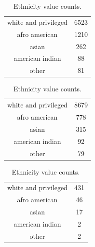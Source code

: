 \begin{table}[!h]
    \caption{Ethnicity value counts.}
    \label{tab:ethnicity}

    \begin{subtable}[ht]{.5\textwidth}
        \centering
        \begin{tabular}{cc}
            white and privileged & 6523 \\
            afro american & 1210 \\
            asian & 262 \\
            american indian & 88 \\
            other & 81 \\
        \end{tabular}
    \end{subtable}
    \begin{subtable}[ht]{.5\textwidth}
        \centering
        \begin{tabular}{cc}
            white and privileged & 8679 \\
            afro american & 778 \\
            asian & 315 \\
            american indian & 92 \\
            other & 79 \\
        \end{tabular}
    \end{subtable}

    \vspace{5mm}

    \begin{subtable}[ht]{.5\textwidth}
        \centering
        \begin{tabular}{cc}
            white and privileged & 431 \\
            afro american & 46 \\
            asian & 17 \\
            american indian & 2 \\
            other & 2 \\
        \end{tabular}
    \end{subtable}
\end{table}



